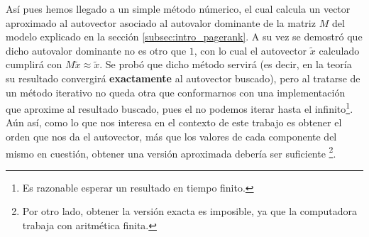 \par As\'i pues hemos llegado a un simple m\'etodo n\'umerico, el cual calcula
un vector aproximado al autovector asociado al autovalor dominante de la matriz
$M$ del modelo explicado en la secci\'on \ref{subsec:intro_pagerank}. A su vez
se demostr\'o que dicho autovalor dominante no es otro que $1$, con lo cual el
autovector $\tilde{x}$ calculado cumplir\'a con $M\tilde{x}\approx\tilde{x}$. Se
prob\'o que dicho m\'etodo servir\'a (es decir, en la teor\'ia su resultado
convergir\'a \textbf{exactamente} al autovector buscado), pero al tratarse de un
m\'etodo iterativo no queda otra que conformarnos con una implementaci\'on que
aproxime al resultado buscado, pues el no podemos iterar hasta el
infinito\footnote{Es razonable esperar un resultado en tiempo finito.}. A\'un
as\'i, como lo que nos interesa en el contexto de este trabajo es obtener el
orden que nos da el autovector, m\'as que los valores de cada componente del
mismo en cuesti\'on, obtener una versi\'on aproximada deber\'ia ser suficiente
\footnote{Por otro lado, obtener la versi\'on exacta es imposible, ya que la
computadora trabaja con aritm\'etica finita.}.
